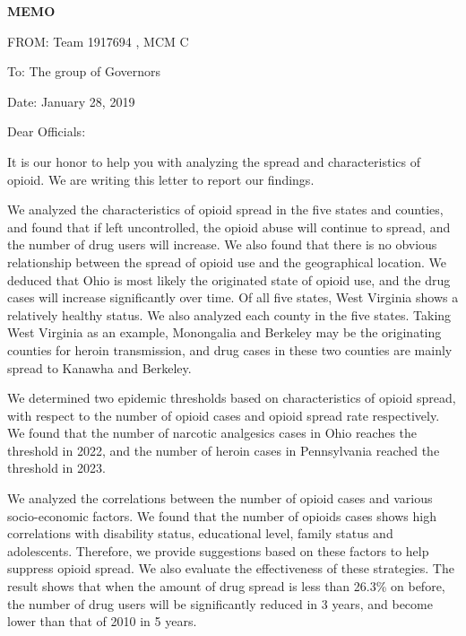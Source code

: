 
\setmainfont{texgyrepagella-regular.otf} %
\newpage
{}
\thispagestyle{empty}

{\centering \fontsize{18pt}{14pt}\selectfont \textbf{MEMO}\par}

\noindent FROM: Team {} 1917694 , MCM C

\noindent To: The group of Governors

\noindent Date: January 28, 2019

\vspace{10pt}

Dear Officials:

It is our honor to help you with analyzing the spread and characteristics of opioid. We are writing this letter to report our findings.

We analyzed the characteristics of opioid spread in the five states and counties, and found that if left uncontrolled, the opioid abuse will continue to spread, and the number of drug users will increase. We also found that there is no obvious relationship between the spread of opioid use and the geographical location. We deduced that Ohio is most likely the originated state of opioid use, and the drug cases will increase significantly over time. Of all five states, West Virginia shows a relatively healthy status. We also analyzed each county in the five states. Taking West Virginia as an example, Monongalia and Berkeley may be the originating counties for heroin transmission, and drug cases in these two counties are mainly spread to Kanawha and Berkeley.

We determined two epidemic thresholds based on characteristics of opioid spread, with respect to the number of opioid cases and opioid spread rate respectively. We found that the number of narcotic analgesics cases in Ohio reaches the threshold in 2022, and the number of heroin cases in Pennsylvania reached the threshold in 2023.

We analyzed the correlations between the number of opioid cases and various socio-economic factors. We found that the number of opioids cases shows high correlations with disability status, educational level, family status and adolescents. Therefore, we provide suggestions based on these factors to help suppress opioid spread. We also evaluate the effectiveness of these strategies. The result shows that when the amount of drug spread is less than 26.3\% on before, the number of drug users will be significantly reduced in 3 years, and become lower than that of 2010 in 5 years. 

